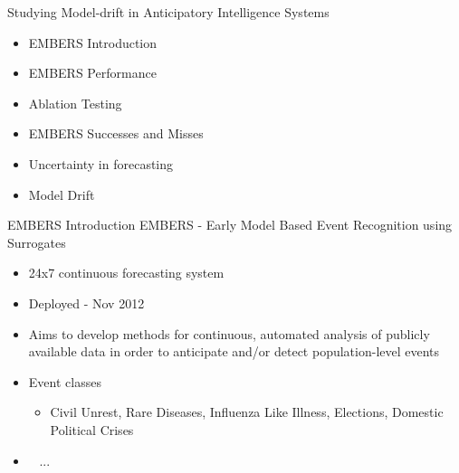 \begin{frame}{Studying Model-drift in Anticipatory Intelligence Systems}
\begin{itemize}
    \item EMBERS Introduction
    \item EMBERS Performance
    \item Ablation Testing
    \item EMBERS Successes and Misses
    \item Uncertainty in forecasting
    \item Model Drift
\end{itemize}
    
\end{frame}
\begin{frame}{EMBERS Introduction}
EMBERS - Early Model Based Event Recognition using Surrogates
    \begin{itemize}
        \item 24x7 continuous forecasting system
        \item Deployed - Nov 2012 
        \item Aims to develop methods for continuous, automated analysis of publicly available data in order to anticipate and/or detect population-level events
        \item Event classes 
            \begin{itemize}
                \item Civil Unrest, Rare Diseases, Influenza Like Illness, Elections, Domestic Political Crises
            \end{itemize}
        \item ~\cite{kdd:beating-the-news, doyle2014forecasting, zhao2014unsupervised} ...
    \end{itemize}
\end{frame}


